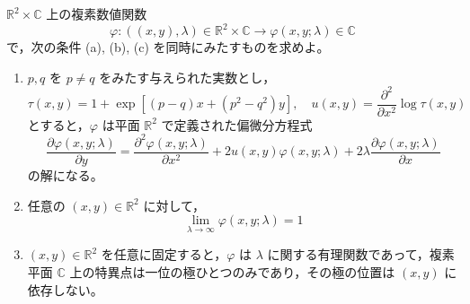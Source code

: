 \documentclass[12pt]{jlreq}
\newcommand{\C}{\mathbb{C}}
\newcommand{\R}{\mathbb{R}}
\begin{document}
$\R^2 \times \C$ 上の複素数値関数
\[
  \varphi : ((x,y), \lambda) \in \R^2 \times \C \longrightarrow \varphi(x,y; \lambda) \in \C
\]
で，次の条件 (a), (b), (c) を同時にみたすものを求めよ。
\begin{enumerate}
  \item[(a)] $p, q$ を $p \ne q$ をみたす与えられた実数とし，
  \[
    \tau(x,y) = 1 + \exp\left[ (p-q)x + (p^2-q^2)y \right],\quad u(x,y) = \frac{\partial^2}{\partial x^2} \log\tau(x,y)
  \]
  とすると，$\varphi$ は平面 $\R^2$ で定義された偏微分方程式
  \[
    \frac{\partial\varphi(x,y;\lambda)}{\partial y} = \frac{\partial^2\varphi(x,y;\lambda)}{\partial x^2} + 2u(x,y)\varphi(x,y;\lambda) + 2\lambda \frac{\partial\varphi(x,y;\lambda)}{\partial x}
  \]
  の解になる。
  \item[(b)] 任意の $(x,y) \in \R^2$ に対して，
  \[
    \lim_{\lambda\to\infty} \varphi(x,y; \lambda) = 1
  \]
  \item[(c)] $(x,y) \in \R^2$ を任意に固定すると，$\varphi$ は $\lambda$ に関する有理関数であって，複素平面 $\C$ 上の特異点は一位の極ひとつのみであり，その極の位置は $(x,y)$ に依存しない。
\end{enumerate}
\end{document}
